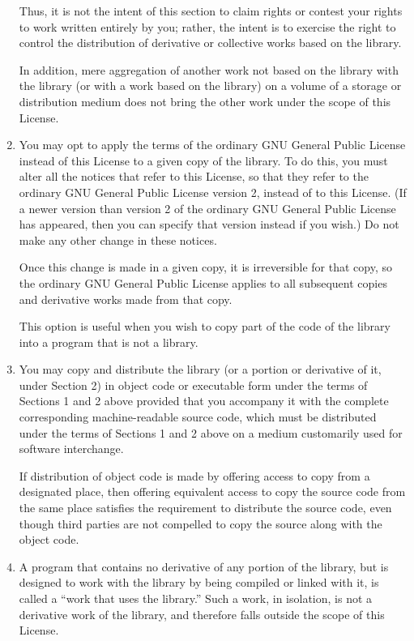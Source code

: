 \documentclass[11pt, letterpaper]{book}
\begin{document}
\begin{enumerate}
Thus, it is not the intent of this section to claim rights or contest your
rights to work written entirely by you; rather, the intent is to exercise
the right to control the distribution of derivative or collective works
based on the library.

In addition, mere aggregation of another work not based on the library
with the library (or with a work based on the library) on a volume of a
storage or distribution medium does not bring the other work under the
scope of this License.

\item

You may opt to apply the terms of the ordinary GNU General Public License
instead of this License to a given copy of the library. To do this, you
must alter all the notices that refer to this License, so that they refer
to the ordinary GNU General Public License version 2, instead of to this
License. (If a newer version than version 2 of the ordinary GNU General
Public License has appeared, then you can specify that version instead if
you wish.)  Do not make any other change in these notices.

Once this change is made in a given copy, it is irreversible for that
copy, so the ordinary GNU General Public License applies to all subsequent
copies and derivative works made from that copy.

This option is useful when you wish to copy part of the code of the
library into a program that is not a library.

\item

You may copy and distribute the library (or a portion or derivative of it,
under Section 2) in object code or executable form under the terms of
Sections 1 and 2 above provided that you accompany it with the complete
corresponding machine-readable source code, which must be distributed
under the terms of Sections 1 and 2 above on a medium customarily used for
software interchange.

If distribution of object code is made by offering access to copy from a
designated place, then offering equivalent access to copy the source code
from the same place satisfies the requirement to distribute the source
code, even though third parties are not compelled to copy the source along
with the object code.

\item

A program that contains no derivative of any portion of the library, but
is designed to work with the library by being compiled or linked with it,
is called a ``work that uses the library.''  Such a work, in isolation, is
not a derivative work of the library, and therefore falls outside the
scope of this License.


\end{enumerate}
\end{document}
